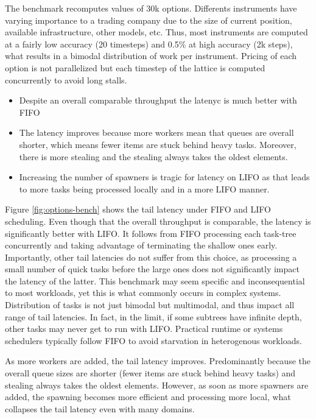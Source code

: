 \documentclass[12pt,a4paper,twoside]{report}
\begin{document}
The benchmark recomputes values of 30k options. Differents instruments have varying importance to a trading company due to the size of current position, available infrastructure, other models, etc. Thus, most instruments are computed at a fairly low accuracy (20 timesteps) and 0.5\% at high accuracy (2k steps), what results in a bimodal distribution of work per instrument. Pricing of each option is not parallelized but each timestep of the lattice is computed concurrently to avoid long stalls. 

\begin{itemize}
    \item Despite an overall comparable throughput the latenyc is much better with FIFO
    \item The latency improves because more workers mean that queues are overall shorter, which means fewer items are stuck behind heavy tasks. Moreover, there is more stealing and the stealing always takes the oldest elements. 
    \item Increasing the number of spawners is tragic for latency on LIFO as that leads to more tasks being processed locally and in a more LIFO manner. 
\end{itemize}

Figure \ref{fig:options-bench} shows the tail latency under FIFO and LIFO scheduling. Even though that the overall throughput is comparable, the latency is significantly better with LIFO. It follows from FIFO processing each task-tree concurrently and taking advantage of terminating the shallow ones early. Importantly, other tail latencies do not suffer from this choice, as processing a small number of quick tasks before the large ones does not significantly impact the latency of the latter. This benchmark may seem specific and inconsequential to most workloads, yet this is what commonly occurs in complex systems. Distribution of tasks is not just bimodal but multimodal, and thus impact all range of tail latencies. In fact, in the limit, if some subtrees have infinite depth, other tasks may never get to run with LIFO. Practical runtime or systems schedulers typically follow FIFO to avoid starvation in heterogenous workloads.   

As more workers are added, the tail latency improves. Predominantly because the overall queue sizes are shorter (fewer items are stuck behind heavy tasks) and stealing always takes the oldest elements. However, as soon as more spawners are added, the spawning becomes more efficient and processing more local, what collapses the tail latency even with many domains. 
\end{document}
